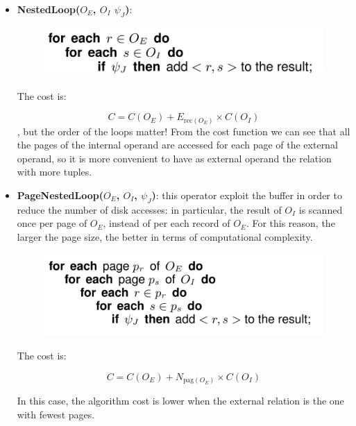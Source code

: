 \begin{itemize}
    \item \textbf{NestedLoop($O_E$, $O_I$ $\psi_J$)}:

    \begin{figure}[h!]
		\centering
		\includegraphics[scale = 0.8]{img/relop7.jpg}
		\label{relop6}
    \end{figure}

    The cost is:

    $$
    C = C(O_E) + E_{\text{rec}(O_E)} \times C(O_I)
    $$
    , but the order of the loops matter! From the cost function we can see that all the pages of the internal operand are accessed for each page of the external operand, so it is more convenient to have as external operand the relation with more tuples.

    \item \textbf{PageNestedLoop($O_E$, $O_I$, $\psi_J$)}: this operator exploit the buffer in order to reduce the number of disk accesses: in particular, the result of $O_I$ is scanned once per page of $O_E$, instead of per each record of $O_E$. For this reason, the larger the page size, the better in terms of computational complexity.

    \begin{figure}[h!]
		\centering
		\includegraphics[scale = 0.8]{img/relop8.jpg}
		\label{relop6}
    \end{figure}

    The cost is:

    $$
    C = C(O_E) + N_{\text{pag}(O_E)} \times C(O_I)
    $$

    In this case, the algorithm cost is lower when the external relation is the one with fewest pages.
    
\end{itemize}

